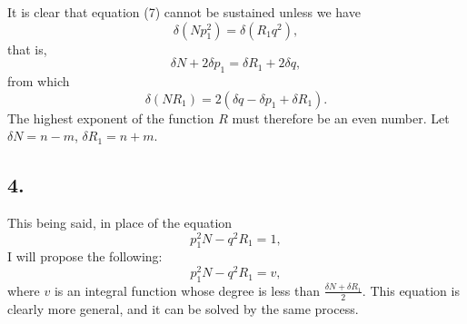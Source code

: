 \documentclass[oneside, 12 pt, leqno]{memoir}
\begin{document}
It is clear that equation (7) cannot be sustained unless we have 
\[\delta\left(N p_1^2\right)=\delta\left(R_1 q^2\right), \]
that is, 
\[\delta N+2 \delta p_1=\delta R_1+2 \delta q,\]
from which
\[\delta\left(N R_1\right)=2\left(\delta q-\delta p_1+\delta R_1\right).\]
The highest exponent of the function \(R\) must therefore be an even number. Let \(\delta N=n-m\), \(\delta R_1=n+m\).

\subsection*{4.}

This being said, in place of the equation
\[p_1^2 N-q^2 R_1=1,\]
I will propose the following:
\[\tag{8}p_1^2 N-q^2 R_1=v,\]
where \(v\) is an integral function whose degree is less than \(\frac{\delta N+\delta R_1}{2}\).  This equation is clearly more general, and it can be solved by the same process.
\end{document}
